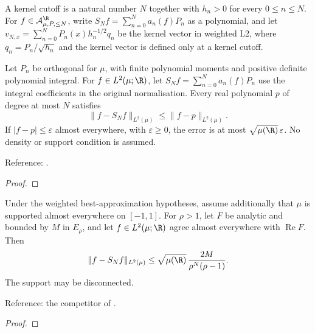\begin{definition}
\label{def:weighted-partial-sum}
\leanok
A kernel cutoff is a natural number $N$ together with $h_n>0$ for every $0\le n\le N$. For $f\in\mathcal A_{\mu,P,\le N}^{\R}$, write $S_Nf=\sum_{n=0}^Na_n(f)P_n$ as a polynomial, and let
$v_{N,x}=\sum_{n=0}^NP_n(x)h_n^{-1/2}q_n$ be the kernel vector in weighted L2,
where $q_n=P_n/\sqrt{h_n}$ and the kernel vector is defined only at a kernel cutoff.
\end{definition}

\begin{theorem}
\label{thm:weighted-best-approximation}
\leanok
Let $P_n$ be orthogonal for $\mu$, with finite polynomial moments and positive
definite polynomial integral. For $f\in L^2(\mu;\R)$, let
$S_Nf=\sum_{n=0}^Na_n(f)P_n$ use the integral coefficients in the original
normalisation. Every real polynomial $p$ of degree at most $N$ satisfies
\[ \|f-S_Nf\|_{L^2(\mu)}\le\|f-p\|_{L^2(\mu)}. \]
If $|f-p|\le\varepsilon$ almost everywhere, with $\varepsilon\ge0$, the error is
at most $\sqrt{\mu(\R)}\,\varepsilon$. No density or support condition is assumed.

Reference: \cite[18.2(viii)]{dlmf}.
\end{theorem}
\begin{proof}
\leanok
\end{proof}

\begin{theorem}
\label{thm:weighted-analytic-approximation}
\leanok
Under the weighted best-approximation hypotheses, assume additionally that
$\mu$ is supported almost everywhere on $[-1,1]$. For $\rho>1$, let $F$ be
analytic and bounded by $M$ in $E_\rho$, and let $f\in L^2(\mu;\R)$ agree almost
everywhere with $\operatorname{Re}F$. Then
\[ \|f-S_Nf\|_{L^2(\mu)}\le
 \sqrt{\mu(\R)}\,\frac{2M}{\rho^N(\rho-1)}. \]
The support may be disconnected.

Reference: the competitor of \cite[Theorem 8.2]{atap}.
\end{theorem}
\begin{proof}
\leanok
\end{proof}

